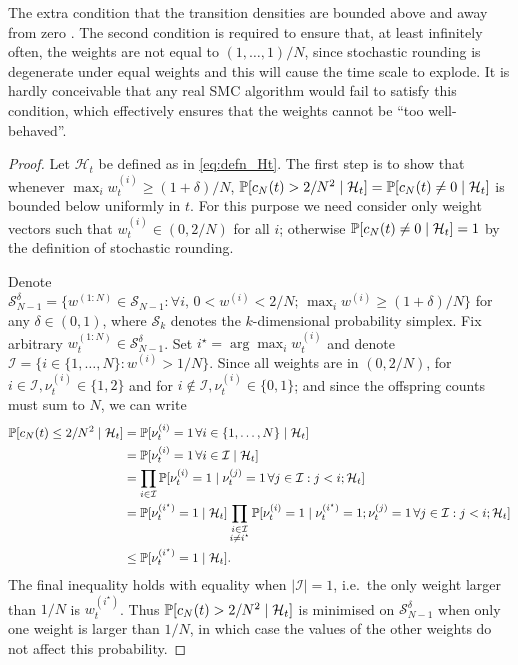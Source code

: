 The extra condition that the transition densities are bounded above and away from zero .
The second condition is required to ensure that, at least infinitely often, the weights are not equal to $(1,\dots,1)/N$, since stochastic rounding is degenerate under equal weights and this will cause the time scale to explode. 
It is hardly conceivable that any real SMC algorithm would fail to satisfy this condition, which effectively ensures that the weights cannot be ``too well-behaved''.

\begin{proof}
Let $\mathcal{H}_t$ be defined as in \eqref{eq:defn_Ht}. The first step is to show that whenever $\max_i w_t^{(i)} \geq (1+\delta)/N$, $\mathbb{P}[  c_N(t) > 2/N^2 \mid \mathcal{H}_t ] = \mathbb{P}[ c_N(t) \neq 0 \mid \mathcal{H}_t ]$ is bounded below uniformly in $t$.
For this purpose we need consider only weight vectors such that $w_t^{(i)} \in (0,2/N)$ for all $i$; otherwise $\mathbb{P}[ c_N(t) \neq 0 \mid \mathcal{H}_t ] =1$ by the definition of stochastic rounding.

Denote $\mathcal{S}_{N-1}^\delta = \{ w^{(1:N)} \in \mathcal{S}_{N-1} :  \forall i, \, 0 <w^{(i)} <2/N ;\, \max_i w^{(i)} \geq (1 + \delta)/N \}$ for any $\delta \in (0, 1)$, where $\mathcal{S}_{k}$ denotes the $k$-dimensional probability simplex.
Fix arbitrary $w_t^{(1:N)} \in \mathcal{S}_{N-1}^\delta$. Set $i^\star = \arg\max_i w_t^{(i)}$ and denote $\mathcal{I} = \{i \in \{1,\dots,N\} : w^{(i)} > 1/N \}$.
Since all weights are in $(0, 2/N)$, for $i \in \mathcal{I}, \nu_t^{(i)} \in \{1,2\}$ and for $i \notin \mathcal{I}, \nu_t^{(i)} \in \{0,1\}$; and since the offspring counts must sum to $N$, we can write
\begin{align}\label{eq:smallcN_istar}
\mathbb{P}[ c_N(t) \leq 2/N^2 \mid \mathcal{H}_t ]
&= \mathbb{P}[ \nu_t^{(i)} =1 \,\forall i\in\{1,\dots,N\} \mid \mathcal{H}_t ] \notag\\
&= \mathbb{P}[ \nu_t^{(i)} =1 \,\forall i\in \mathcal{I} \mid \mathcal{H}_t ] \notag\\
&= \prod_{i \in \mathcal{I}} \mathbb{P}[ \nu_t^{(i)} =1 \mid \nu_t^{(j)}=1 \,\forall j \in \mathcal{I}: j<i; \mathcal{H}_t ] \notag\\
&= \mathbb{P}[ \nu_t^{(i^\star)} =1 \mid \mathcal{H}_t ] \prod_{\substack{i \in \mathcal{I} \\ i \neq i^\star}} \mathbb{P}[ \nu_t^{(i)} =1 \mid \nu_t^{(i^\star)}=1; \nu_t^{(j)}=1 \,\forall j \in \mathcal{I}: j<i ; \mathcal{H}_t ] \notag\\
&\leq \mathbb{P}[ \nu_t^{(i^\star)} =1 \mid \mathcal{H}_t ] .
\end{align}
The final inequality holds with equality when $|\mathcal{I}| =1$, i.e.\ the only weight larger than $1/N$ is $w_t^{(i^\star)}$.
Thus $\mathbb{P}[ c_N(t) > 2/N^2 \mid \mathcal{H}_t ]$ is minimised on $\mathcal{S}_{N-1}^\delta$ when only one weight is larger than $1/N$, in which case the values of the other weights do not affect this probability. 


\end{proof}
